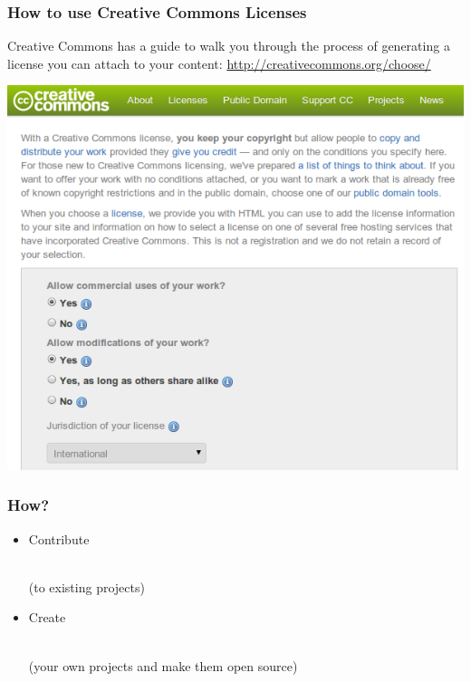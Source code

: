\documentclass{beamer}
\begin{document}
\begin{frame}
  \frametitle{How to use Creative Commons Licenses}

  Creative Commons has a guide to walk you through the process of generating a license you can attach to your content: \href{http://creativecommons.org/choose/}{http://creativecommons.org/choose/}

  \begin{center}
    \includegraphics[height=0.7\textheight]{../img/cc-guide-short}
  \end{center}
  
\end{frame}

\begin{frame}
  \frametitle{How?}
  \begin{itemize}
    \setlength{\itemsep}{2em}
  \item \begin{LARGE} Contribute \end{LARGE} \\ (to existing projects)
  \item \begin{LARGE} Create \end{LARGE} \\ (your own projects and make them open source)
  \end{itemize}
\end{frame}

\end{document}

